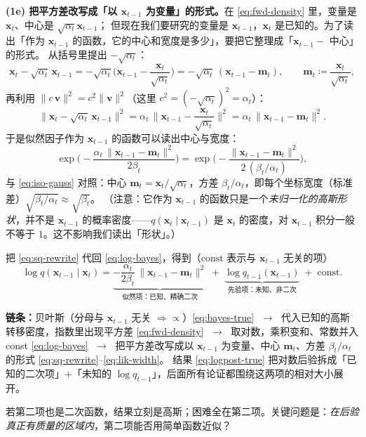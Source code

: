 \documentclass[a4paper,fontset=none,zihao=5]{ctexart}
\numberwithin{equation}{section}
\newcommand{\x}{\mathbf{x}}
\begin{document}
\textbf{(1e) 把平方差改写成「以 $\x_{t-1}$ 为变量」的形式。}在 \eqref{eq:fwd-density} 里，变量是 $\x_t$、中心是 $\sqrt{\alpha_t}\x_{t-1}$；
但现在我们要研究的变量是 $\x_{t-1}$，$\x_t$ 是已知的。为了读出「作为 $\x_{t-1}$ 的函数，它的中心和宽度是多少」，要把它整理成「$\x_{t-1}-$ 中心」的形式。
从括号里提出 $-\sqrt{\alpha_t}$：
\begin{equation}
  \x_t-\sqrt{\alpha_t}\,\x_{t-1}=-\sqrt{\alpha_t}\Big(\x_{t-1}-\frac{\x_t}{\sqrt{\alpha_t}}\Big)=-\sqrt{\alpha_t}\,(\x_{t-1}-\mathbf{m}_t),
  \qquad \mathbf{m}_t\coloneqq\frac{\x_t}{\sqrt{\alpha_t}} ,
\end{equation}
再利用 $\|c\,\mathbf{v}\|^2=c^2\|\mathbf{v}\|^2$（这里 $c^2=(-\sqrt{\alpha_t})^2=\alpha_t$）：
\begin{equation}
  \|\x_t-\sqrt{\alpha_t}\,\x_{t-1}\|^2=\alpha_t\,\Big\|\x_{t-1}-\frac{\x_t}{\sqrt{\alpha_t}}\Big\|^2
  =\alpha_t\,\|\x_{t-1}-\mathbf{m}_t\|^2 .
  \label{eq:sq-rewrite}
\end{equation}
于是似然因子作为 $\x_{t-1}$ 的函数可以读出中心与宽度：
\begin{equation}
  \exp\!\Big(-\frac{\alpha_t\,\|\x_{t-1}-\mathbf{m}_t\|^2}{2\beta_t}\Big)
  =\exp\!\Big(-\frac{\|\x_{t-1}-\mathbf{m}_t\|^2}{2\,(\beta_t/\alpha_t)}\Big),
  \label{eq:lik-width}
\end{equation}
与 \eqref{eq:iso-gauss} 对照：中心 $\mathbf{m}_t=\x_t/\sqrt{\alpha_t}$，方差 $\beta_t/\alpha_t$，即每个坐标宽度（标准差）$\sqrt{\beta_t/\alpha_t}\approx\sqrt{\beta_t}$。
（注意：它作为 $\x_{t-1}$ 的函数只是一个\emph{未归一化的高斯形状}，并不是 $\x_{t-1}$ 的概率密度——$q(\x_t\mid\x_{t-1})$ 是 $\x_t$ 的密度，对 $\x_{t-1}$ 积分一般不等于 $1$。这不影响我们读出「形状」。）

把 \eqref{eq:sq-rewrite} 代回 \eqref{eq:log-bayes}，得到（$\mathrm{const}$ 表示与 $\x_{t-1}$ 无关的项）
\begin{equation}
  \log q(\x_{t-1}\mid\x_t)
  =\underbrace{-\frac{\alpha_t}{2\beta_t}\,\|\x_{t-1}-\mathbf{m}_t\|^2}_{\text{似然项：已知、精确二次}}
  \;+\;\underbrace{\log q_{t-1}(\x_{t-1})}_{\text{先验项：未知、非二次}}
  \;+\;\mathrm{const}.
  \label{eq:logpost-true}
\end{equation}

\begin{whybox}[title={\sffamily\bfseries 这一步在做什么？}]
\textbf{链条：}贝叶斯（分母与 $\x_{t-1}$ 无关 $\Rightarrow\propto$）\eqref{eq:bayes-true}
$\;\to\;$ 代入已知的高斯转移密度，指数里出现平方差 \eqref{eq:fwd-density}
$\;\to\;$ 取对数，乘积变和、常数并入 const \eqref{eq:log-bayes}
$\;\to\;$ 把平方差改写成以 $\x_{t-1}$ 为变量、中心 $\mathbf{m}_t$、方差 $\beta_t/\alpha_t$ 的形式 \eqref{eq:sq-rewrite}–\eqref{eq:lik-width}。
结果 \eqref{eq:logpost-true} 把对数后验拆成「已知的二次项」+「未知的 $\log q_{t-1}$」，后面所有论证都围绕这两项的相对大小展开。
\end{whybox}
若第二项也是二次函数，结果立刻是高斯；困难全在第二项。关键问题是：\emph{在后验真正有质量的区域内}，第二项能否用简单函数近似？
\end{document}
